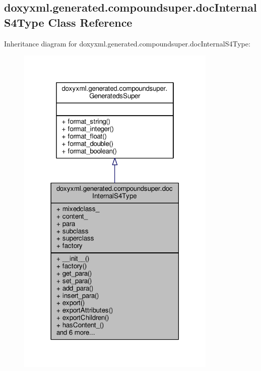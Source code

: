 \subsection{doxyxml.\+generated.\+compoundsuper.\+doc\+Internal\+S4\+Type Class Reference}
\label{classdoxyxml_1_1generated_1_1compoundsuper_1_1docInternalS4Type}


Inheritance diagram for doxyxml.\+generated.\+compoundsuper.\+doc\+Internal\+S4\+Type\+:
\nopagebreak
\begin{figure}[H]
\begin{center}
\leavevmode
\includegraphics[width=270pt]{dd/d95/classdoxyxml_1_1generated_1_1compoundsuper_1_1docInternalS4Type__inherit__graph}
\end{center}
\end{figure}


